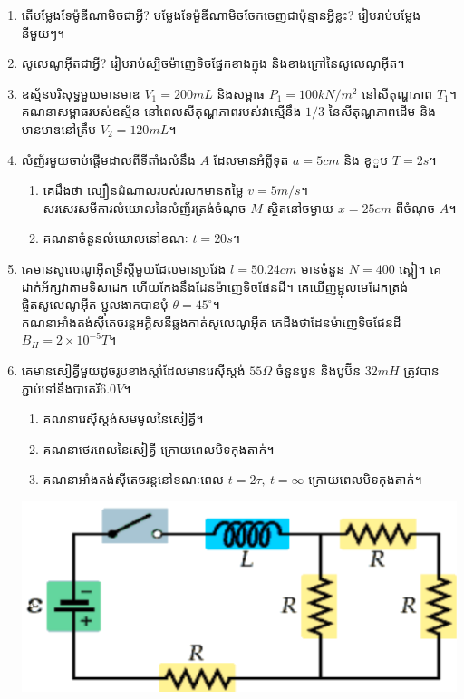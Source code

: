 \documentclass{officialexam}
\begin{document}
\begin{enumerate}[I]
	\item តើបម្លែងទែម៉ូឌីណាមិចជាអ្វី? បម្លែងទែម៉ួឌីណាមិចចែកចេញជាប៉ុន្មានអ្វីខ្លះ? រៀបរាប់បម្លែងនីមួយៗ។
	\item សូលេណូអុីតជាអ្វី? រៀបរាប់ស្បិចម៉ាញេទិចផ្នែកខាងក្នុង និងខាងក្រៅនៃសូលេណូអុីត។
	\item ឧស្ម័នបរិសុទ្ធមួយមានមាឌ $V_{1}=200mL$ និងសម្ពាធ $P_{1}=100kN/m^2$ នៅសីតុណ្ហភាព $T_{1}$។\\
	គណនាសម្ពាធរបស់ឧស្ម័ន នៅពេលសីតុណ្ហភាពរបស់វាស្មើនឹង $1/3$ នៃសីតុណ្ហភាពដើម និង មានមាឌនៅត្រឹម $V_{2}=120mL$។
	\item លំញ័រមួយចាប់ផ្ដើមដាលពីទីតាំងលំនឹង $A$ ដែលមានអំព្លីទុត $a=5cm$ និង ខូួប $T=2s$។
	\begin{enumerate}[k]
		\item គេដឹងថា ល្បឿនដំណាលរបស់រលកមានតម្លៃ $v=5m/s$។\\ សរសេរសមីការលំយោលនៃលំញ័រត្រង់ចំណុច $M$ ស្ថិតនៅចម្ងាយ $x=25cm$ ពីចំណុច $A$។
		\item គណនាចំនួនលំយោលនៅខណៈ $t=20s$។
	\end{enumerate}  
	\item គេមានសូលេណូអុីតទ្រឹស្តីមួយដែលមានប្រវែង $l=50.24cm$ មានចំនួន $N=400$ ស្ពៀ។ គេដាក់អ័ក្សវាតាមទិសដេក ហើយកែងនឹងដែនម៉ាញេទិចផែនដី។ គេឃើញម្ជុលមេដែកត្រង់ផ្ចិតសូលេណូអុីត ម្ជុលងាកបានមុំ $\theta=45^\circ$។\\ គណនាអាំងតង់សុីតេចរន្តអគ្គិសនីឆ្លងកាត់សូលេណូអុីត គេដឹងថាដែនម៉ាញេទិចផែនដី $B_{H}=2\times10^{-5}T$។
	\item គេមានសៀគ្វីមួយដូចរូបខាងស្តាំដែលមានរេសុីស្តង់ $55\Omega$ ចំនួនបួន និងបូប៊ីន $32mH$ ត្រូវបានភ្ជាប់ទៅនឹងបាតេរី​ $6.0V$។
	\begin{multicols}{2}
		\begin{enumerate}[k]
			\item គណនារេសុីស្តង់សមមូលនៃសៀគ្វី។
			\item គណនាថេរពេលនៃសៀគ្វី ក្រោយពេលបិទកុងតាក់។
			\item គណនាអាំងតង់សុីតេចរន្តនៅខណៈពេល $t=2\tau,~t=\infty$ ក្រោយពេលបិទកុងតាក់។
		\end{enumerate}
		\includegraphics[scale=1.7]{image11}

\end{multicols}
\end{enumerate}
\end{document}
